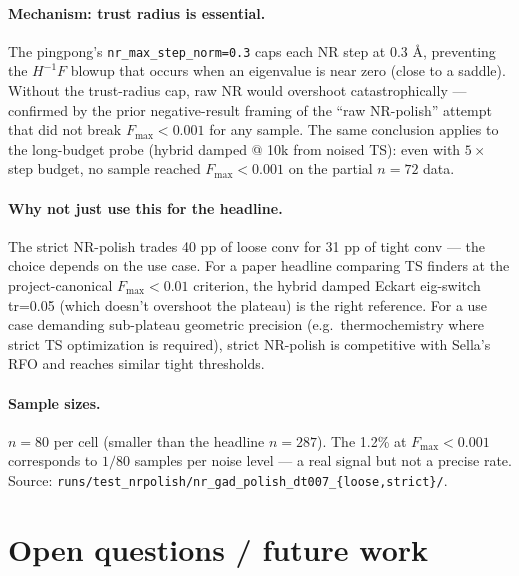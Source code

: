\documentclass[11pt]{article}
\begin{document}
\paragraph{Mechanism: trust radius is essential.} The pingpong's
\texttt{nr\_max\_step\_norm=0.3} caps each NR step at 0.3 Å, preventing
the $H^{-1}F$ blowup that occurs when an eigenvalue is near zero (close
to a saddle). Without the trust-radius cap, raw NR would overshoot
catastrophically — confirmed by the prior negative-result framing of the
``raw NR-polish'' attempt that did not break $F_\mathrm{max}<0.001$ for
any sample. The same conclusion applies to the long-budget probe
(hybrid damped @ 10k from noised TS): even with $5\times$ step budget,
no sample reached $F_\mathrm{max}<0.001$ on the partial $n=72$ data.

\paragraph{Why not just use this for the headline.} The strict
NR-polish trades 40 pp of loose conv for 31 pp of tight conv — the choice
depends on the use case. For a paper headline comparing TS finders at
the project-canonical $F_\mathrm{max}<0.01$ criterion, the hybrid damped
Eckart eig-switch tr=0.05 (which doesn't overshoot the plateau) is the
right reference. For a use case demanding sub-plateau geometric
precision (e.g.\ thermochemistry where strict TS optimization is
required), strict NR-polish is competitive with Sella's RFO and reaches
similar tight thresholds.

\paragraph{Sample sizes.} $n=80$ per cell (smaller than the
headline $n=287$). The 1.2\% at $F_\mathrm{max}<0.001$ corresponds to
$1/80$ samples per noise level — a real signal but not a precise rate.
Source: \texttt{runs/test\_nrpolish/nr\_gad\_polish\_dt007\_\{loose,strict\}/}.

\clearpage
\section*{Open questions / future work}
\end{document}
